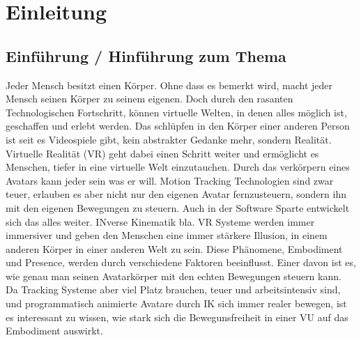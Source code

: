 \chapter{Einleitung}

\section{Einführung / Hinführung zum Thema}
Jeder Mensch besitzt einen Körper. Ohne dass es bemerkt wird, macht jeder Mensch seinen Körper zu seinem eigenen. Doch durch den rasanten Technologischen Fortschritt, können virtuelle Welten, in denen alles möglich ist, geschaffen und erlebt werden. Das schlüpfen in den Körper einer anderen Person ist seit es Videospiele gibt, kein abstrakter Gedanke mehr, sondern Realität. Virtuelle Realität (VR) geht dabei einen Schritt weiter und ermöglicht es Menschen, tiefer in eine virtuelle Welt einzutauchen. Durch das verkörpern eines Avatars kann jeder sein was er will. Motion Tracking Technologien sind zwar teuer, erlauben es aber nicht nur den eigenen Avatar fernzusteuern, sondern ihn mit den eigenen Bewegungen zu steuern. Auch in der Software Sparte entwickelt sich das alles weiter. INverse Kinematik bla.
VR Systeme werden immer immersiver und geben den Menschen eine immer stärkere Illusion, in einem anderen Körper in einer anderen Welt zu sein. Diese Phänomene, Embodiment und Presence, werden durch verschiedene Faktoren beeinflusst. Einer davon ist es, wie genau man seinen Avatarkörper mit den echten Bewegungen steuern kann. Da Tracking Systeme aber viel Platz brauchen, teuer und arbeitsintensiv sind, und programmatisch animierte Avatare durch IK sich immer realer bewegen, ist es interessant zu wissen, wie stark sich die Bewegunsfreiheit in einer VU auf das Embodiment auswirkt. 


